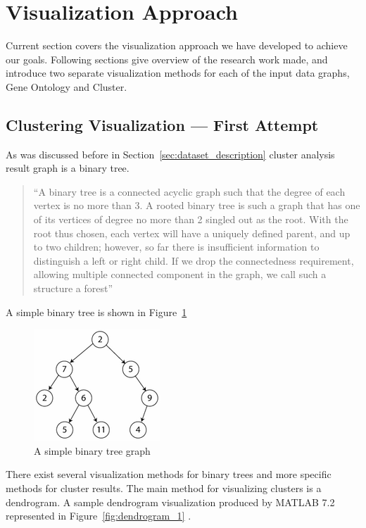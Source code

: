 \newpage
\section{Visualization Approach}
\label{sec:solution}

Current section covers the visualization approach we have developed to achieve our goals. Following sections give overview of the research work made,
and introduce two separate visualization methods for each of the input data graphs, Gene Ontology and Cluster.


\subsection{Clustering Visualization --- First Attempt}
\label{sec:probe}

As was discussed before in Section~\ref{sec:dataset_description} cluster analysis result graph is a binary tree.

\begin{quotation}
``A binary tree is a connected acyclic graph such that the degree of each vertex is no more than 3.
A rooted binary tree is such a graph that has one of its vertices of degree no more than 2 singled out as the root.
With the root thus chosen, each vertex will have a uniquely defined parent, and up to two children; however, so far there is insufficient information to distinguish a left or right child.
If we drop the connectedness requirement, allowing multiple connected component in the graph, we call such a structure a forest''~\cite{BINARY_TREE}
\end{quotation}

A simple binary tree is shown in Figure~\ref{fig:simple_binary_tree}

\begin{figure}[h!]
\centering
\includegraphics[scale=1.0]{pictures/simple_binary_tree.png}
\caption{A simple binary tree graph}
\label{fig:simple_binary_tree}
\end{figure}

There exist several visualization methods for binary trees and more specific methods for cluster results.
The main method for visualizing clusters is a dendrogram. A sample dendrogram visualization produced by MATLAB 7.2 represented in Figure~\ref{fig:dendrogram_1} .

